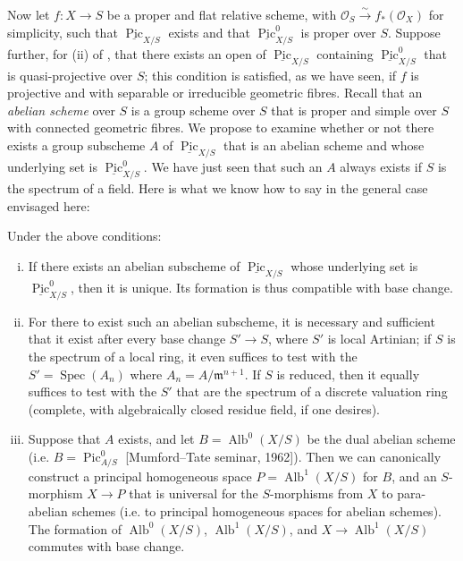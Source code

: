 Now let $f\colon X\to S$ be a proper and flat relative scheme, with $\mathcal{O}_S\xrightarrow{\sim} f_*(\mathcal{O}_X)$ for simplicity, such that $\underline{\operatorname{Pic}}_{X/S}$ exists and that $\underline{\operatorname{Pic}}_{X/S}^0$ is proper over $S$.
Suppose further, for (ii) of , that there exists an open of $\underline{\operatorname{Pic}}_{X/S}$ containing $\underline{\operatorname{Pic}}_{X/S}^0$ that is quasi-projective over $S$;
this condition is satisfied, as we have seen, if $f$ is projective and with separable or irreducible geometric fibres.
Recall that an \emph{abelian scheme} over $S$ is a group scheme over $S$ that is proper and simple over $S$ with connected geometric fibres.
We propose to examine whether or not there exists a group subscheme $A$ of $\underline{\operatorname{Pic}}_{X/S}$ that is an abelian scheme and whose underlying set is $\underline{\operatorname{Pic}}_{X/S}^0$.
We have just seen that such an $A$ always exists if $S$ is the spectrum of a field.
Here is what we know how to say in the general case envisaged here:


\begin{theorem}\label{fga3.vi-3-theorem-3.3}
    Under the above conditions:

    \begin{enumerate}[i.]
        \item If there exists an abelian subscheme of $\underline{\operatorname{Pic}}_{X/S}$ whose underlying set is $\underline{\operatorname{Pic}}_{X/S}^0$, then it is unique.
              Its formation is thus compatible with base change.
        \item For there to exist such an abelian subscheme, it is necessary and sufficient that it exist after every base change $S'\to S$, where $S'$ is local Artinian;
              if $S$ is the spectrum of a local ring, it even suffices to test with the $S'=\operatorname{Spec}(A_n)$ where $A_n=A/\mathfrak{m}^{n+1}$.
              If $S$ is reduced, then it equally suffices to test with the $S'$ that are the spectrum of a discrete valuation ring (complete, with algebraically closed residue field, if one desires).
        \item Suppose that $A$ exists, and let $B=\operatorname{Alb}^0(X/S)$ be the dual abelian scheme (i.e. $B=\operatorname{Pic}_{A/S}^0$ [Mumford–Tate seminar, 1962]).
              Then we can canonically construct a principal homogeneous space $P=\operatorname{Alb}^1(X/S)$ for $B$, and an $S$-morphism $X\to P$ that is universal for the $S$-morphisms from $X$ to para-abelian schemes (i.e. to principal homogeneous spaces for abelian schemes).
              The formation of $\operatorname{Alb}^0(X/S)$, $\operatorname{Alb}^1(X/S)$, and $X\to\operatorname{Alb}^1(X/S)$ commutes with base change.
    \end{enumerate}
\end{theorem}

